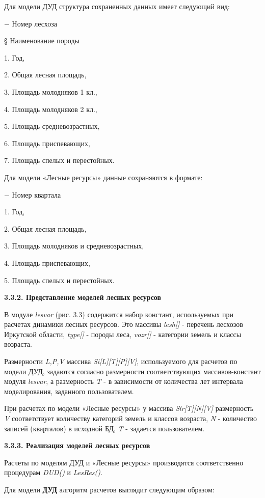 \documentclass{article}
\begin{document}
Для модели ДУД структура сохраненных данных 
имеет следующий вид:

\ensuremath{-} Номер лесхоза

\S{} Наименование породы

1. Год,

2. Общая лесная площадь,

3. Площадь молодняков 1 кл.,

4. Площадь молодняков 2 кл.,

5. Площадь средневозрастных,

6. Площадь приспевающих,

7. Площадь спелых и перестойных.

Для модели «Лесные ресурсы» данные сохраняются 
в формате:

\ensuremath{-} Номер квартала

1. Год,

2. Общая лесная площадь,

3. Площадь молодняков и средневозрастных,

4. Площадь приспевающих,

5. Площадь спелых и перестойных.\label{HToc199746729}

\textbf{3.3.2. Представление моделей лесных ресурсов}

В модуле \textit{lesvar} (рис. 3.3) содержится набор констант, 
используемых при расчетах динамики лесных 
ресурсов. Это массивы \textit{lesh[]} - перечень лесхозов 
Иркутской области, \textit{type[]} - породы леса, \textit{vozr[]} 
- категории земель и классы возраста.

Размерности \textit{L,P,V} массива \textit{Si[L][T][P][V]}, используемого 
для расчетов по модели ДУД, задаются согласно 
размерности соответствующих массивов-констант 
модуля \textit{lesvar}, а размерность \textit{T} - в зависимости 
от количества лет интервала моделирования, 
заданного пользователем.

При расчетах по модели «Лесные ресурсы» у массива 
\textit{Slr[T][N][V]} размерность \textit{V} соответствует 
количеству категорий земель и классов возраста, 
\textit{N} - количество записей (кварталов) в исходной 
БД, \textit{T} - задается пользователем.\label{HToc199746730}

\textbf{3.3.3. Реализация моделей лесных ресурсов}

Расчеты по моделям ДУД и «Лесные ресурсы» производятся 
соответственно процедурам \textit{DUD()} и \textit{LesRes()}. 

Для модели \textbf{ДУД} алгоритм расчетов выглядит 
следующим образом:
\end{document}
